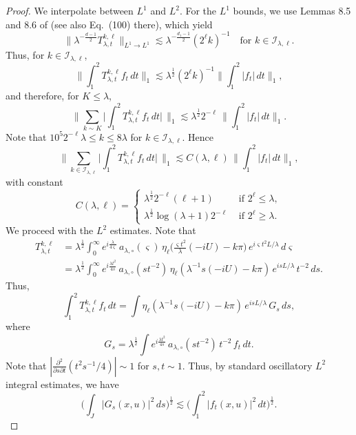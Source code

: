 \documentclass[leqno]{amsart}
\theoremstyle{definition}
\theoremstyle{remark}
\numberwithin{equation}{section}
\newcommand\lc{\lesssim}
\newcommand\la{{\lambda}}
\begin{document}
\begin{proof}
We interpolate between $L^1$ and $L^2$. For the $L^1$ bounds, we use Lemmas 8.5 and 8.6 of \cite{MuellerSeeger2015} (see also Eq.\ (100) there), which yield
 \[\|\la^{-\frac{d-1}{2}} T_{\lambda,t}^{k,\ell} \|_{L^1\to L^1} \lc \la^{-\frac{d_1-1}{2} } (2^\ell k)^{-1} \quad\text{for }k\in
 \mathcal I_{\lambda,\ell}.
 \]
Thus, for $k\in\mathcal I_{\lambda,\ell}$, 
 \[ \Big\|\int_1^2 T^{k,\ell}_{\la,t} f_t \, dt\Big\|_1\lc \la ^{\frac{1}{2}} (2^\ell k)^{-1} \Big\|\int_1^2 |f_t| \, dt\Big\|_1,\]
 and therefore, for $K\le \la$,
 \[
 \Big\| \sum_{k\sim K} \Big|\int_1^2 T^{k,\ell}_{\la,t} f_t \, dt\Big| \, \Big\|_1 \lc \la^{\frac{1}{2}} 2^{-\ell} \, 
 \Big\|\int_1^2 |f_t| \, dt\Big\|_1.\]
 Note that $10^5 2^{-\ell} \lambda \le k \le 8\lambda$ for $k\in\mathcal I_{\lambda,\ell}$. 
 Hence
 \begin{equation}\label{L1}
 \Big\| \sum_{k\in\mathcal I_{\lambda,\ell}} \Big|\int_1^2 T^{k,\ell}_{\la,t} f_t \, dt\Big| \, \Big\|_1 \lc 
 C(\lambda,\ell) \, 
 \Big\|\int_1^2 |f_t| \, dt\Big\|_1 ,
\end{equation}
with constant
\[
C(\lambda,\ell) = \begin{cases}\la^{\frac{1}{2}} 2^{-\ell} (\ell + 1)
 &\text{ if } 2^\ell\le \la,
 \\
 \la^{\frac{1}{2}} \log(\la + 1) 2^{-\ell} 
 &\text{ if } 2^\ell\ge \la.
\end{cases}
\]
We proceed with the $L^2$ estimates. Note that 
\begin{align*}T^{k,\ell}_{\la,t}& = \la^{\frac{1}{2}}\int_0^\infty  e^{i\frac{\la}{ 4 \varsigma} } \, a_{\lambda,\circ}(\varsigma) \, \eta_\ell\Big(\frac{\varsigma t^2}{\la} ( -iU )-k\pi\Big) \, e^{i\varsigma t^2 L/\la} \, d\varsigma
\\& = \la^{\frac{1}{2}} \int_0^\infty e^{i\frac{\la t^2}{ 4 s}} \, a_{ \la, \circ}(st^{-2}) \, \eta_\ell(\la^{-1} s(-iU)-k\pi) \, e^{isL/\la} \, t^{-2} \, ds.
\label{s-integral}
\end{align*} 
Thus,
\[ 
\int_1^2 T^{k,\ell}_{\la,t}f_t \, dt = \int\eta_\ell(\la^{-1} s(-iU)-k\pi) \, e^{isL/\la} \, G_s \, ds,
\]
where
\[G_s = 
\la^{\frac{1}{2}} \int e^{i\frac{\la t^2}{ 4 s}} \, a_{\lambda,\circ}(st^{-2}) \, t^{-2} \, f_t \, dt.\]
Note that $|\frac{\partial^2}{\partial s\partial t} (t^2s^{-1}/ 4 ) |\sim 1$ for $s,t\sim 1$. Thus, by standard oscillatory $L^2$ integral estimates, we have
\begin{equation}\label{hoerm} \Big(\int_J | G_s(x,u)|^2 \, ds\Big)^{\frac{1}{2}} \lc \Big(\int_1 ^2 |f_t(x,u)|^2 \, dt\Big)^{\frac{1}{2}}. \end{equation}

\end{proof}
\end{document}

